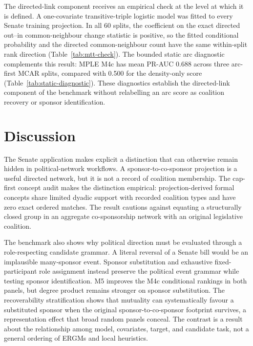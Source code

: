 \documentclass{nws}
\begin{document}
The directed-link component receives an empirical check at the level at which it is defined. A one-covariate transitive-triple logistic model was fitted to every Senate training projection. In all 60 splits, the coefficient on the exact directed out--in common-neighbour change statistic is positive, so the fitted conditional probability and the directed common-neighbour count have the same within-split rank direction (Table~\ref{tab:mtt-check}). The bounded static arc diagnostic complements this result: MPLE M4c has mean PR-AUC 0.688 across three arc-first MCAR splits, compared with 0.500 for the density-only score (Table~\ref{tab:static-diagnostic}). These diagnostics establish the directed-link component of the benchmark without relabelling an arc score as coalition recovery or sponsor identification.




\section{Discussion}\label{sec:discussion}

The Senate application makes explicit a distinction that can otherwise remain hidden in political-network workflows. A sponsor-to-co-sponsor projection is a useful directed network, but it is not a record of coalition membership. The cap-first concept audit makes the distinction empirical: projection-derived formal concepts share limited dyadic support with recorded coalition types and have zero exact ordered matches. The result cautions against equating a structurally closed group in an aggregate co-sponsorship network with an original legislative coalition.

The benchmark also shows why political direction must be evaluated through a role-respecting candidate grammar. A literal reversal of a Senate bill would be an implausible many-sponsor event. Sponsor substitution and exhaustive fixed-participant role assignment instead preserve the political event grammar while testing sponsor identification. M5 improves the M4c conditional rankings in both panels, but degree product remains stronger on sponsor substitution. The recoverability stratification shows that mutuality can systematically favour a substituted sponsor when the original sponsor-to-co-sponsor footprint survives, a representation effect that broad random panels conceal. The contrast is a result about the relationship among model, covariates, target, and candidate task, not a general ordering of ERGMs and local heuristics.
\end{document}
